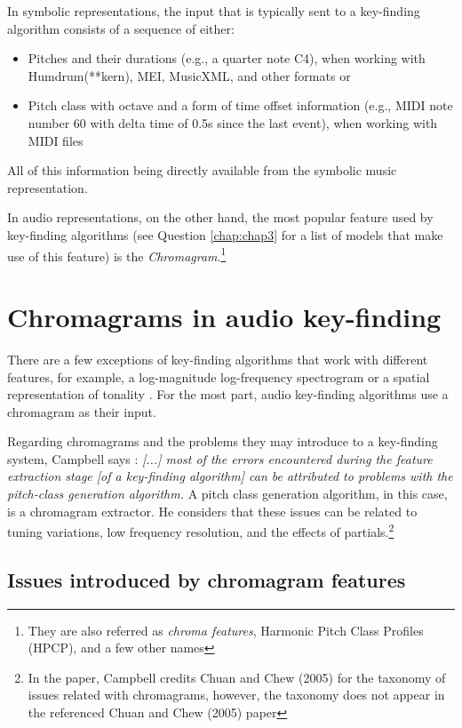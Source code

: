 In symbolic representations, the input that is typically sent to a key-finding algorithm consists of a sequence of either: 
\begin{itemize}
    \item Pitches and their durations (e.g., a quarter note C4), when working with Humdrum(**kern), MEI, MusicXML, and other formats or
    \item Pitch class with octave and a form of time offset information (e.g., MIDI note number 60 with delta time of 0.5s since the last event), when working with MIDI files
\end{itemize}
 All of this information being directly available from the symbolic music representation.

In audio representations, on the other hand, the most popular feature used by key-finding algorithms (see Question \ref{chap:chap3} for a list of models that make use of this feature) is the \emph{Chromagram}.\footnote{They are also referred as \emph{chroma features}, Harmonic Pitch Class Profiles (HPCP), and a few other names}

\section{Chromagrams in audio key-finding}

There are a few exceptions of key-finding algorithms that work with different features, for example, a log-magnitude log-frequency spectrogram \cite{korzeniowski_genre-agnostic_2018} or a spatial representation of tonality \cite{arndt_circular_2008, harte_detecting_2006, lee_unified_2007}. For the most part, audio key-finding algorithms use a chromagram as their input.

Regarding chromagrams and the problems they may introduce to a key-finding system, Campbell says \cite{campbell_automatic_2010}: \emph{[...] most of the errors encountered during the feature extraction stage [of a key-finding algorithm] can be attributed to problems with the pitch-class generation algorithm.} A pitch class generation algorithm, in this case, is a chromagram extractor. He considers that these issues can be related to tuning variations, low frequency resolution, and the effects of partials.\footnote{In the paper, Campbell credits Chuan and Chew (2005) for the taxonomy of issues related with chromagrams, however, the taxonomy does not appear in the referenced Chuan and Chew (2005) paper}

\subsection{Issues introduced by chromagram features}

